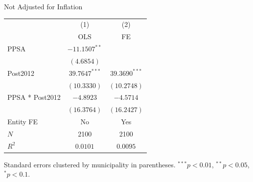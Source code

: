 \documentclass[border=10pt,varwidth=25cm]{standalone}
\renewenvironment{table}[1][]{}{}
\begin{document}
\begin{table}[H]
    \centering
    \scriptsize
    \begin{minipage}{\textwidth}
    \centering
    {\normalsize Not Adjusted for Inflation}
    \vspace{6pt}
    \begin{tabular}{lcc}
        \toprule
         & (1) & (2) \\
         & OLS & FE \\
        \midrule
        PPSA & $-11.1507^{**}$ &  \\
         & $(4.6854)$ &  \\[4pt]
        Post2012 & $39.7647^{***}$ & $39.3690^{***}$ \\
         & $(10.3330)$ & $(10.2748)$ \\[4pt]
        PPSA * Post2012 & $-4.8923$ & $-4.5714$ \\
         & $(16.3764)$ & $(16.2427)$ \\[4pt]
        \midrule
        Entity FE & No & Yes \\
        $N$ & 2100 & 2100 \\
        $R^2$ & $0.0101$ & $0.0095$ \\
        \bottomrule
    \end{tabular}

    \vspace{6pt}
    {\scriptsize Standard errors clustered by municipality in parentheses. $^{***}p<0.01$, $^{**}p<0.05$, $^{*}p<0.1$.}
    \end{minipage}
\end{table}
\end{document}
